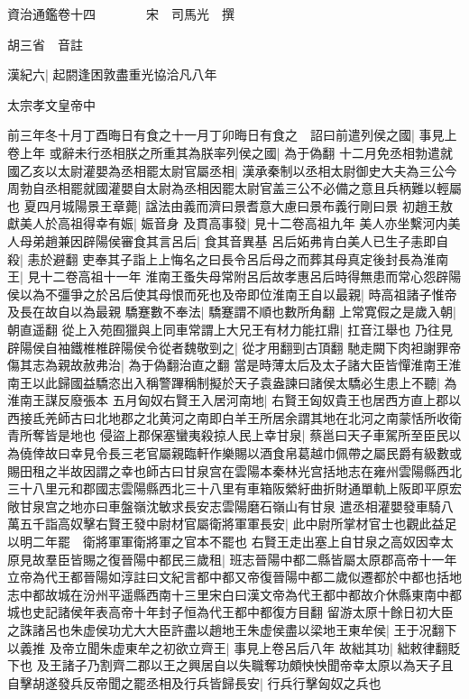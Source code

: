 資治通鑑卷十四　　　　宋　司馬光　撰

胡三省　音註

漢紀六|{
	起閼逢困敦盡重光協洽凡八年}


太宗孝文皇帝中

前三年冬十月丁酉晦日有食之十一月丁卯晦日有食之　詔曰前遣列侯之國|{
	事見上卷上年}
或辭未行丞相朕之所重其為朕率列侯之國|{
	為于偽翻}
十二月免丞相勃遣就國乙亥以太尉灌嬰為丞相罷太尉官屬丞相|{
	漢承秦制以丞相太尉御史大夫為三公今周勃自丞相罷就國灌嬰自太尉為丞相因罷太尉官盖三公不必備之意且兵柄難以輕屬也}
夏四月城陽景王章薨|{
	諡法由義而濟曰景耆意大慮曰景布義行剛曰景}
初趙王敖獻美人於高祖得幸有娠|{
	娠音身}
及貫高事發|{
	見十二卷高祖九年}
美人亦坐繫河内美人母弟趙兼因辟陽侯審食其言呂后|{
	食其音異基}
呂后妬弗肯白美人已生子恚即自殺|{
	恚於避翻}
吏奉其子詣上上悔名之曰長令呂后母之而葬其母真定後封長為淮南王|{
	見十二卷高祖十一年}
淮南王蚤失母常附呂后故孝惠呂后時得無患而常心怨辟陽侯以為不彊爭之於呂后使其母恨而死也及帝即位淮南王自以最親|{
	時高祖諸子惟帝及長在故自以為最親}
驕蹇數不奉法|{
	驕蹇謂不順也數所角翻}
上常寛假之是歲入朝|{
	朝直遥翻}
從上入苑囿獵與上同車常謂上大兄王有材力能扛鼎|{
	扛音江舉也}
乃往見辟陽侯自袖鐵椎椎辟陽侯令從者魏敬剄之|{
	從才用翻剄古頂翻}
馳走闕下肉袒謝罪帝傷其志為親故赦弗治|{
	為于偽翻治直之翻}
當是時薄太后及太子諸大臣皆憚淮南王淮南王以此歸國益驕恣出入稱警蹕稱制擬於天子袁盎諫曰諸侯太驕必生患上不聽|{
	為淮南王謀反廢張本}
五月匈奴右賢王入居河南地|{
	右賢王匈奴貴王也居西方直上郡以西接氐羌師古曰北地郡之北黄河之南即白羊王所居余謂其地在北河之南蒙恬所收衛青所奪皆是地也}
侵盜上郡保塞蠻夷殺掠人民上幸甘泉|{
	蔡邕曰天子車駕所至臣民以為僥倖故曰幸見令長三老官屬親臨軒作樂賜以酒食帛葛越巾佩帶之屬民爵有級數或賜田租之半故因謂之幸也師古曰甘泉宫在雲陽本秦林光宫括地志在雍州雲陽縣西北三十八里元和郡國志雲陽縣西北三十八里有車箱阪縈紆曲折財通單軌上阪即平原宏敞甘泉宫之地亦曰車盤嶺沈敏求長安志雲陽磨石嶺山有甘泉}
遣丞相灌嬰發車騎八萬五千詣高奴擊右賢王發中尉材官屬衛將軍軍長安|{
	此中尉所掌材官士也觀此益足以明二年罷　衛將軍軍衛將軍之官本不罷也}
右賢王走出塞上自甘泉之高奴因幸太原見故羣臣皆賜之復晉陽中都民三歲租|{
	班志晉陽中都二縣皆屬太原郡高帝十一年立帝為代王都晉陽如淳註曰文紀言都中都又帝復晉陽中都二歲似遷都於中都也括地志中都故城在汾州平遥縣西南十三里宋白曰漢文帝為代王都中都故介休縣東南中都城也史記諸侯年表高帝十年封子恒為代王都中都復方目翻}
留游太原十餘日初大臣之誅諸呂也朱虚侯功尤大大臣許盡以趙地王朱虚侯盡以梁地王東牟侯|{
	王于况翻下以義推}
及帝立聞朱虚東牟之初欲立齊王|{
	事見上卷呂后八年}
故絀其功|{
	絀敕律翻貶下也}
及王諸子乃割齊二郡以王之興居自以失職奪功頗怏怏聞帝幸太原以為天子且自擊胡遂發兵反帝聞之罷丞相及行兵皆歸長安|{
	行兵行擊匈奴之兵也}
